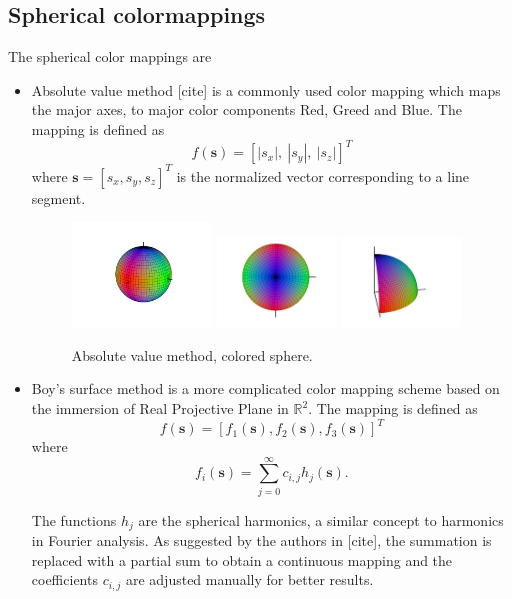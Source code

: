 \documentclass[hyperref, plainreport, noproblem]{cgvpub1}
\begin{document}
\subsection*{Spherical colormappings}
The spherical color mappings are
\begin{itemize}
	\item Absolute value method [cite] is a commonly used color mapping which maps the major axes, to major color components Red, Greed and Blue. The mapping is defined as 
	\begin{equation}
		f(\mathbf{s})=[|s_x|, \ |s_y|, \ |s_z|]^T
	\end{equation}
	where $\mathbf{s}=[s_x ,s_y, s_z]^T$ is the normalized vector corresponding to a line segment.  
	\begin{figure}
		\centering
		\includegraphics[width=0.35\textwidth]{absolute}
		\includegraphics[width=0.3\textwidth]{absolute_top}
		\includegraphics[width=0.3\textwidth]{absolute_octant}
		\caption{Absolute value method, colored sphere.}
	\end{figure}
	
	\item Boy's surface method is a more complicated color mapping scheme based on the immersion of Real Projective Plane in $\mathbb{R}^2$. The mapping is defined as 
	\begin{equation}
		f(\mathbf{s})=[f_1(\mathbf{s}), f_2(\mathbf{s}), f_3(\mathbf{s})]^T
	\end{equation}
	where 
	\begin{equation}
		f_i(\mathbf{s})=\sum_{j=0}^{\infty} c_{i,j} h_j(\mathbf{s}).
	\end{equation}
	
The functions $h_j$ are the spherical harmonics, a similar concept to harmonics in Fourier analysis. As suggested by the authors in [cite], the summation is replaced with a partial sum to obtain a continuous mapping and the coefficients $c_{i,j}$ are adjusted manually for better results. 
\end{itemize}
\end{document}
